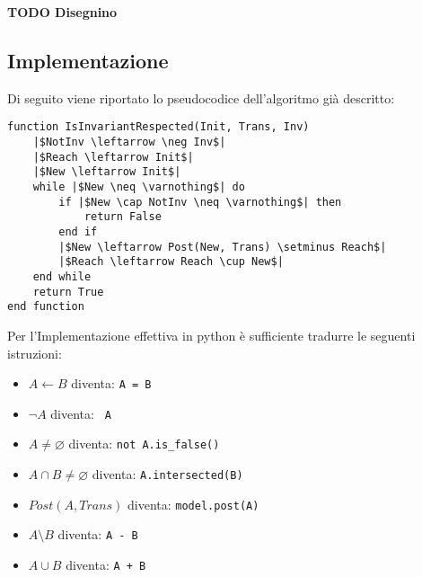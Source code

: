 \documentclass[12pt]{article}
\begin{document}
    \textbf{TODO Disegnino}

    \subsection{Implementazione}
    Di seguito viene riportato lo pseudocodice dell'algoritmo già descritto:

    \begin{verbatim}
function IsInvariantRespected(Init, Trans, Inv)
    |$NotInv \leftarrow \neg Inv$|
    |$Reach \leftarrow Init$|
    |$New \leftarrow Init$|
    while |$New \neq \varnothing$| do
        if |$New \cap NotInv \neq \varnothing$| then
            return False
        end if
        |$New \leftarrow Post(New, Trans) \setminus Reach$|
        |$Reach \leftarrow Reach \cup New$|
    end while
    return True
end function
    \end{verbatim}

    Per l'Implementazione effettiva in python è sufficiente tradurre le seguenti istruzioni:
    \begin{itemize}
        \item $A \leftarrow B$ diventa: \texttt{A = B}
        \item $\neg A$ diventa: \texttt{~A}
        \item $A \neq \varnothing$ diventa: \texttt{not A.is_false()}
        \item $A \cap B \neq \varnothing$ diventa: \texttt{A.intersected(B)}
        \item $Post(A, Trans)$ diventa: \texttt{model.post(A)}
        \item $A \setminus B$ diventa: \texttt{A - B}
        \item $A \cup B$ diventa: \texttt{A + B}
    \end{itemize}


    
\end{document}
